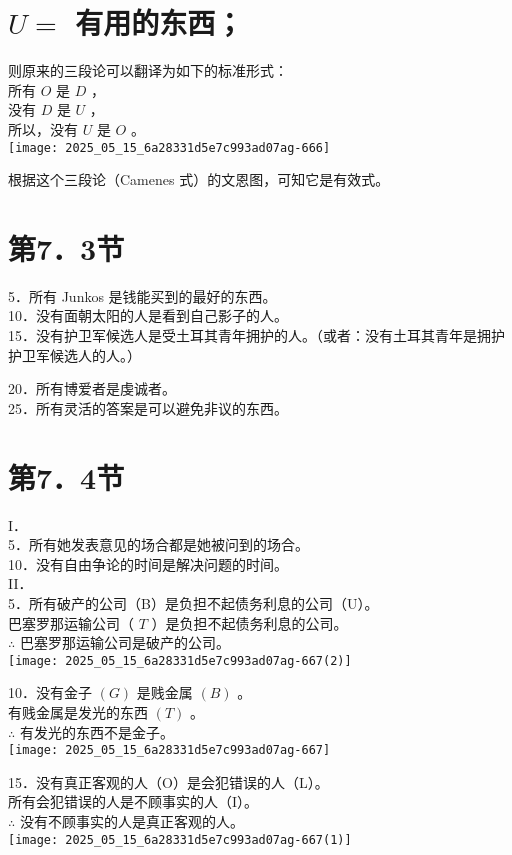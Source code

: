 \section*{$U=$ 有用的东西；}
则原来的三段论可以翻译为如下的标准形式：\\
所有 $O$ 是 $D$ ，\\
没有 $D$ 是 $U$ ，\\
所以，没有 $U$ 是 $O$ 。\\
\texttt{[image: 2025\_05\_15\_6a28331d5e7c993ad07ag-666]}

根据这个三段论（Camenes 式）的文恩图，可知它是有效式。

\section*{第7．3节}
5．所有 Junkos 是钱能买到的最好的东西。\\
10．没有面朝太阳的人是看到自己影子的人。\\
15．没有护卫军候选人是受土耳其青年拥护的人。（或者：没有土耳其青年是拥护护卫军候选人的人。）

20．所有博爱者是虔诚者。\\
25．所有灵活的答案是可以避免非议的东西。

\section*{第7．4节}
I．\\
5．所有她发表意见的场合都是她被问到的场合。\\
10．没有自由争论的时间是解决问题的时间。\\
II．\\
5．所有破产的公司（B）是负担不起债务利息的公司（U）。\\
巴塞罗那运输公司（ $T$ ）是负担不起债务利息的公司。\\
$\therefore$ 巴塞罗那运输公司是破产的公司。\\
\texttt{[image: 2025\_05\_15\_6a28331d5e7c993ad07ag-667(2)]}

10．没有金子 $(G)$ 是贱金属 $(B)$ 。\\
有贱金属是发光的东西 $(T)$ 。\\
$\therefore$ 有发光的东西不是金子。\\
\texttt{[image: 2025\_05\_15\_6a28331d5e7c993ad07ag-667]}

15．没有真正客观的人（O）是会犯错误的人（L）。\\
所有会犯错误的人是不顾事实的人（I）。\\
$\therefore$ 没有不顾事实的人是真正客观的人。\\
\texttt{[image: 2025\_05\_15\_6a28331d5e7c993ad07ag-667(1)]}

